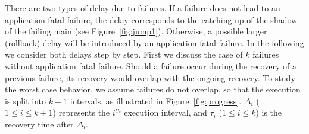 There are two types of delay due to failures. If a failure does not lead to an application fatal failure, the delay corresponds to the catching up of the shadow of the failing main (see Figure~\ref{fig:jump1}). Otherwise, a possible larger (rollback) delay will be introduced by an application fatal failure. In the following we consider both delays step by step. 
First we discuss the case of $k$ failures without application fatal failure. Should a failure occur during the recovery of a previous failure, its recovery would overlap with the ongoing recovery. To study the worst case behavior, we assume failures do not overlap, so that the execution is split into $k+1$ intervals, as illustrated in Figure~\ref{fig:progress}. 
$\Delta_i$ ($1\le i \le k+1$) represents the $i^{th}$ execution interval, and $\tau_i$ ($1\le i \le k$) is the recovery time after $\Delta_i$. 

